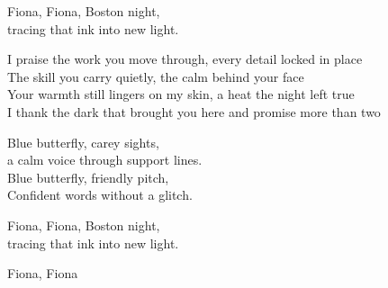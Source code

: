 \begin{lyrics}
Fiona, Fiona, Boston night,\\
tracing that ink into new light.

I praise the work you move through, every detail locked in place\\
The skill you carry quietly, the calm behind your face\\
Your warmth still lingers on my skin, a heat the night left true\\
I thank the dark that brought you here and promise more than two

Blue butterfly, carey sights,\\
a calm voice through support lines.\\
Blue butterfly, friendly pitch,\\
Confident words without a glitch.

Fiona, Fiona, Boston night,\\
tracing that ink into new light.

Fiona, Fiona
\end{lyrics}
